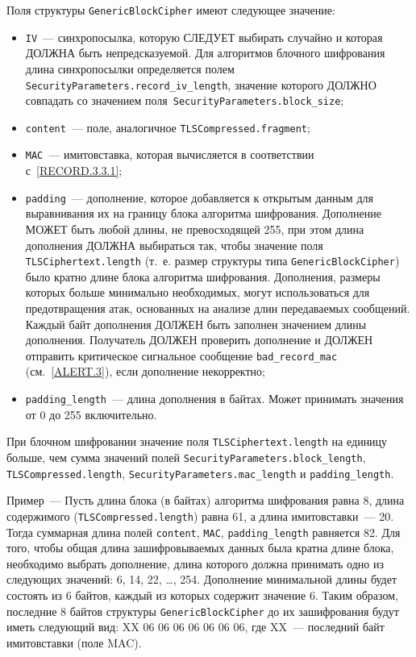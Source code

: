 Поля структуры \lstinline{GenericBlockCipher} имеют следующее значение:
\begin{itemize}
\item[--]
\lstinline{IV}~--- синхропосылка, которую СЛЕДУЕТ выбирать случайно и которая ДОЛЖНА 
быть непредсказуемой. Для алгоритмов блочного шифрования длина 
синхропосылки определяется полем \lstinline{SecurityParameters.record_iv_length}, 
значение которого ДОЛЖНО совпадать со значением 
поля~\lstinline{SecurityParameters.block_size}; 

\item[--] 
\lstinline{content}~--- поле, аналогичное \lstinline{TLSCompressed.fragment};

\item[--]
\lstinline{MAC}~--- имитовставка, которая вычисляется в соответствии 
с~\ref{RECORD.3.3.1};

\item[--]
\lstinline{padding}~--- дополнение, которое добавляется к открытым данным для 
выравнивания их на границу блока алгоритма шифрования. Дополнение МОЖЕТ 
быть любой длины, не превосходящей 255, при этом длина дополнения ДОЛЖНА 
выбираться так, чтобы значение поля \lstinline{TLSCiphertext.length} 
(т.~е. размер структуры типа \lstinline{GenericBlockCipher}) было кратно 
длине блока алгоритма шифрования. Дополнения, размеры которых больше 
минимально необходимых, могут использоваться для предотвращения атак, 
основанных на анализе длин передаваемых сообщений. Каждый байт дополнения 
ДОЛЖЕН быть заполнен значением длины дополнения. Получатель ДОЛЖЕН 
проверить дополнение и ДОЛЖЕН отправить критическое сигнальное сообщение 
\lstinline{bad_record_mac} (см.~\ref{ALERT.3}), если дополнение 
некорректно;

\item[--]
\lstinline{padding_length}~--- длина дополнения в байтах. Может принимать 
значения от 0 до 255 включительно.  
\end{itemize}

При блочном шифровании значение поля \lstinline{TLSCiphertext.length} на 
единицу больше, чем сумма значений полей 
\lstinline{SecurityParameters.block_length},  
\lstinline{TLSCompressed.length}, 
\lstinline{SecurityParameters.mac_length} и \lstinline{padding_length}.  

\begin{example}
Пример~--- Пусть длина блока (в байтах) алгоритма шифрования равна 8, 
длина содержимого (\lstinline{TLSCompressed.length}) равна 61, 
а длина имитовставки~--- 20. 
Тогда суммарная длина полей \lstinline{content}, \lstinline{MAC}, 
\lstinline{padding_length} равняется 82. Для того, чтобы общая длина 
зашифровываемых данных была кратна длине блока, необходимо выбрать 
дополнение, длина которого должна принимать одно из следующих значений: 6, 
14, 22, \ldots, 254. Дополнение минимальной длины будет  
состоять из 6 байтов, каждый из которых содержит значение 6. Таким 
образом, последние 8 байтов структуры \lstinline{GenericBlockCipher} до их 
зашифрования будут иметь следующий вид: XX 06 06 06 06 06 06 06, где XX~--- 
последний байт имитовставки (поле MAC).
\end{example}

